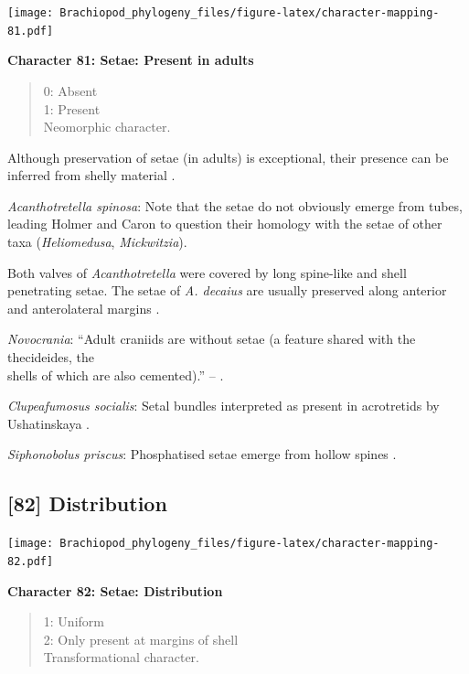 \documentclass[openany]{book}
\theoremstyle{definition}
\theoremstyle{definition}
\theoremstyle{definition}
\theoremstyle{remark}
\begin{document}
\texttt{[image: Brachiopod\_phylogeny\_files/figure-latex/character-mapping-81.pdf]}

\textbf{Character 81: Setae: Present in adults}

\begin{quote}
0: Absent\\
1: Present\\
Neomorphic character.
\end{quote}

Although preservation of setae (in adults) is exceptional, their
presence can be inferred from shelly material
\citep[see][]{Holmer2006Aspinose}.

\emph{Acanthotretella spinosa}: Note that the setae do not obviously
emerge from tubes, leading Holmer and Caron to question their homology
with the setae of other taxa (\emph{Heliomedusa}, \emph{Mickwitzia}).

Both valves of \emph{Acanthotretella} were covered by long spine-like
and shell penetrating setae. The setae of \emph{A. decaius} are usually
preserved along anterior and anterolateral margins
\citep{Hu2010Softpart}.

\emph{Novocrania}: ``Adult craniids are without setae (a feature shared
with the thecideides, the\\
shells of which are also cemented).'' -- \citet{Williams2007PartH}.

\emph{Clupeafumosus socialis}: Setal bundles interpreted as present in
acrotretids by Ushatinskaya \citeyearpar{Ushatinskaya2016Protegulumand}.

\emph{Siphonobolus priscus}: Phosphatised setae emerge from hollow
spines \citep{Popov2009Earlyontogeny}.

\hypertarget{distribution}{%
\subsection*{{[}82{]} Distribution}\label{distribution}}

\texttt{[image: Brachiopod\_phylogeny\_files/figure-latex/character-mapping-82.pdf]}

\textbf{Character 82: Setae: Distribution}

\begin{quote}
1: Uniform\\
2: Only present at margins of shell\\
Transformational character.
\end{quote}
\end{document}
